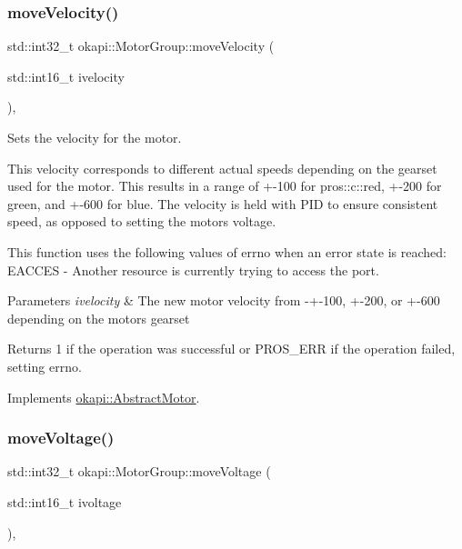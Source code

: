 \subsubsection{\texorpdfstring{moveVelocity()}{moveVelocity()}}
{\footnotesize\ttfamily std\+::int32\+\_\+t okapi\+::\+Motor\+Group\+::move\+Velocity (\begin{DoxyParamCaption}\item[{std\+::int16\+\_\+t}]{ivelocity }\end{DoxyParamCaption})\hspace{0.3cm}{\ttfamily [override]}, {\ttfamily [virtual]}}

Sets the velocity for the motor.

This velocity corresponds to different actual speeds depending on the gearset used for the motor. This results in a range of +-\/100 for pros\+::c\+::red, +-\/200 for green, and +-\/600 for blue. The velocity is held with P\+ID to ensure consistent speed, as opposed to setting the motor\textquotesingle{}s voltage.

This function uses the following values of errno when an error state is reached\+: E\+A\+C\+C\+ES -\/ Another resource is currently trying to access the port.


\begin{DoxyParams}{Parameters}
{\em ivelocity} & The new motor velocity from -\/+-\/100, +-\/200, or +-\/600 depending on the motor\textquotesingle{}s gearset \\
\hline
\end{DoxyParams}
\begin{DoxyReturn}{Returns}
1 if the operation was successful or {\ttfamily P\+R\+O\+S\+\_\+\+E\+RR} if the operation failed, setting errno. 
\end{DoxyReturn}


Implements \mbox{\hyperlink{classokapi_1_1AbstractMotor_a3170268f8d06f728327dcda08505e02b}{okapi\+::\+Abstract\+Motor}}.

\mbox{\label{classokapi_1_1MotorGroup_acebebe160f2c733ee497b1b8b50b0781}} 
\subsubsection{\texorpdfstring{moveVoltage()}{moveVoltage()}}
{\footnotesize\ttfamily std\+::int32\+\_\+t okapi\+::\+Motor\+Group\+::move\+Voltage (\begin{DoxyParamCaption}\item[{std\+::int16\+\_\+t}]{ivoltage }\end{DoxyParamCaption})\hspace{0.3cm}{\ttfamily [override]}, {\ttfamily [virtual]}}

